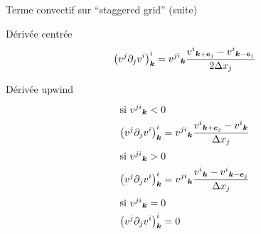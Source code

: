\begin{frame}{Terme convectif sur ``staggered grid'' (suite)}
\begin{block}{Dérivée centrée}
 \begin{equation*}
\left(v^{j}\partial_{j}v^{i}\right)^{i}_{{\boldsymbol {k}}}={v^{ji}}_{{\boldsymbol {k}}}\frac{{v^{i}}_{{\boldsymbol {k}}+{\boldsymbol {e}}_j}-{v^{i}}_{{\boldsymbol {k}}-{\boldsymbol {e}}_j}}{2\Delta x_{j}}
\end{equation*}
\end{block}

\begin{block}{Dérivée upwind}
 \begin{align*}
\intertext{si ${v^{ji}}_{{\boldsymbol {k}}}<0$}
\left(v^{j}\partial_{j}v^{i}\right)^{i}_{{\boldsymbol {k}}}&={v^{ji}}_{{\boldsymbol {k}}}\frac{{v^{i}}_{{\boldsymbol {k}}+{\boldsymbol {e}}_j}-{v^{i}}_{{\boldsymbol {k}}}}{\Delta x_{j}}\\
\intertext{si ${v^{ji}}_{{\boldsymbol {k}}}>0$}
\left(v^{j}\partial_{j}v^{i}\right)^{i}_{{\boldsymbol {k}}}&={v^{ji}}_{{\boldsymbol {k}}}\frac{{v^{i}}_{{\boldsymbol {k}}}-{v^{i}}_{{\boldsymbol {k}}-{\boldsymbol {e}}_j}}{\Delta x_{j}}\\
\intertext{si ${v^{ji}}_{{\boldsymbol {k}}}=0$}
\left(v^{j}\partial_{j}v^{i}\right)^{i}_{{\boldsymbol {k}}}&=0
\end{align*}
\end{block}

\end{frame}
